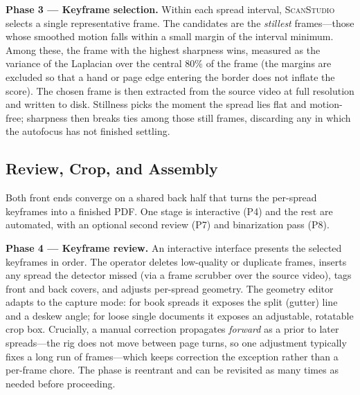 \documentclass{article}
\newcommand{\sys}{\textsc{ScanStudio}\xspace}
\begin{document}
\noindent\textbf{Phase 3 --- Keyframe selection.}
Within each spread interval, \sys selects a single representative frame. The
candidates are the \emph{stillest} frames---those whose smoothed motion falls
within a small margin of the interval minimum. Among these, the frame with the
highest sharpness wins, measured as the variance of the Laplacian over the
central $80\%$ of the frame (the margins are excluded so that a hand or page edge
entering the border does not inflate the score). The chosen frame is then
extracted from the source video at full resolution and written to disk. Stillness
picks the moment the spread lies flat and motion-free; sharpness then breaks ties
among those still frames, discarding any in which the autofocus has not finished
settling.

\subsection{Review, Crop, and Assembly}
\label{sec:backhalf}

Both front ends converge on a shared back half that turns the per-spread
keyframes into a finished PDF. One stage is interactive (P4) and the rest are
automated, with an optional second review (P7) and binarization pass (P8).

\noindent\textbf{Phase 4 --- Keyframe review.}
An interactive interface presents the selected keyframes in order. The operator
deletes low-quality or duplicate frames, inserts any spread the detector missed
(via a frame scrubber over the source video), tags front and back covers, and
adjusts per-spread geometry. The geometry editor adapts to the capture mode: for
book spreads it exposes the split (gutter) line and a deskew angle; for loose
single documents it exposes an adjustable, rotatable crop box. Crucially, a
manual correction propagates \emph{forward} as a prior to later spreads---the
rig does not move between page turns, so one adjustment typically fixes a long
run of frames---which keeps correction the exception rather than a per-frame
chore. The phase is reentrant and can be revisited as many times as needed
before proceeding.
\end{document}
